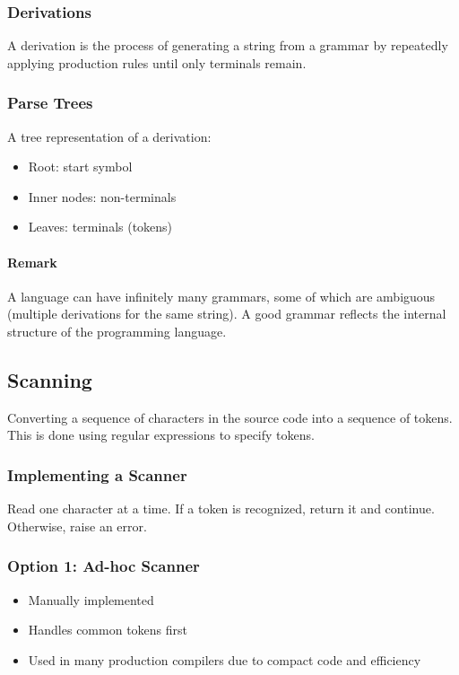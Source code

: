\documentclass{article}
\begin{document}
\subsubsection{Derivations}
A derivation is the process of generating a string from a grammar by repeatedly applying production rules until only terminals remain.

\subsubsection{Parse Trees}
A tree representation of a derivation:
\begin{itemize}
  \item Root: start symbol
  \item Inner nodes: non-terminals
  \item Leaves: terminals (tokens)
\end{itemize}

\paragraph{Remark}
A language can have infinitely many grammars, some of which are ambiguous (multiple derivations for the same string).  
A good grammar reflects the internal structure of the programming language.


\subsection{Scanning}

Converting a sequence of characters in the source code into a sequence of tokens.  
This is done using regular expressions to specify tokens.

\subsubsection{Implementing a Scanner}
Read one character at a time. If a token is recognized, return it and continue. Otherwise, raise an error.

\subsubsection{Option 1: Ad-hoc Scanner}
\begin{itemize}
  \item Manually implemented
  \item Handles common tokens first
  \item Used in many production compilers due to compact code and efficiency
\end{itemize}
\end{document}
